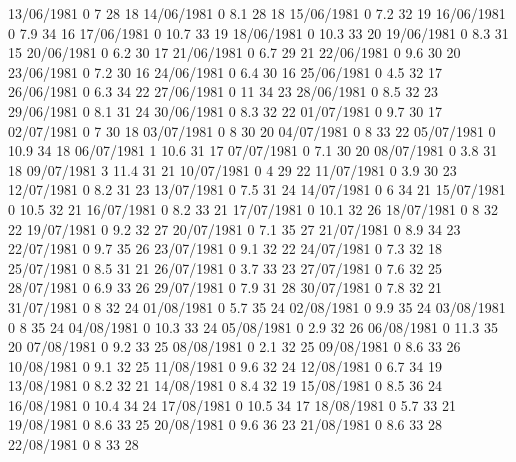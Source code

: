 13/06/1981  0      7      28     18 
14/06/1981  0      8.1    28     18 
15/06/1981  0      7.2    32     19 
16/06/1981  0      7.9    34     16 
17/06/1981  0      10.7   33     19 
18/06/1981  0      10.3   33     20 
19/06/1981  0      8.3    31     15 
20/06/1981  0      6.2    30     17 
21/06/1981  0      6.7    29     21 
22/06/1981  0      9.6    30     20 
23/06/1981  0      7.2    30     16 
24/06/1981  0      6.4    30     16 
25/06/1981  0      4.5    32     17 
26/06/1981  0      6.3    34     22 
27/06/1981  0      11     34     23 
28/06/1981  0      8.5    32     23 
29/06/1981  0      8.1    31     24 
30/06/1981  0      8.3    32     22 
01/07/1981  0      9.7    30     17 
02/07/1981  0      7      30     18 
03/07/1981  0      8      30     20 
04/07/1981  0      8      33     22 
05/07/1981  0      10.9   34     18 
06/07/1981  1      10.6   31     17 
07/07/1981  0      7.1    30     20 
08/07/1981  0      3.8    31     18 
09/07/1981  3      11.4   31     21 
10/07/1981  0      4      29     22 
11/07/1981  0      3.9    30     23 
12/07/1981  0      8.2    31     23 
13/07/1981  0      7.5    31     24 
14/07/1981  0      6      34     21 
15/07/1981  0      10.5   32     21 
16/07/1981  0      8.2    33     21 
17/07/1981  0      10.1   32     26 
18/07/1981  0      8      32     22 
19/07/1981  0      9.2    32     27 
20/07/1981  0      7.1    35     27 
21/07/1981  0      8.9    34     23 
22/07/1981  0      9.7    35     26 
23/07/1981  0      9.1    32     22 
24/07/1981  0      7.3    32     18 
25/07/1981  0      8.5    31     21 
26/07/1981  0      3.7    33     23 
27/07/1981  0      7.6    32     25 
28/07/1981  0      6.9    33     26 
29/07/1981  0      7.9    31     28 
30/07/1981  0      7.8    32     21 
31/07/1981  0      8      32     24 
01/08/1981  0      5.7    35     24 
02/08/1981  0      9.9    35     24 
03/08/1981  0      8      35     24 
04/08/1981  0      10.3   33     24 
05/08/1981  0      2.9    32     26 
06/08/1981  0      11.3   35     20 
07/08/1981  0      9.2    33     25 
08/08/1981  0      2.1    32     25 
09/08/1981  0      8.6    33     26 
10/08/1981  0      9.1    32     25 
11/08/1981  0      9.6    32     24 
12/08/1981  0      6.7    34     19 
13/08/1981  0      8.2    32     21 
14/08/1981  0      8.4    32     19 
15/08/1981  0      8.5    36     24 
16/08/1981  0      10.4   34     24 
17/08/1981  0      10.5   34     17 
18/08/1981  0      5.7    33     21 
19/08/1981  0      8.6    33     25 
20/08/1981  0      9.6    36     23 
21/08/1981  0      8.6    33     28 
22/08/1981  0      8      33     28 
